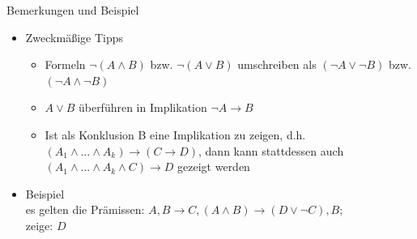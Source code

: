 
\begin{frame}{Bemerkungen und Beispiel}
	\begin{itemize}
		\item Zweckmäßige Tipps
		\begin{itemize}
			\item Formeln $\neg (A \land B)$ bzw. $\neg (A \lor B)$ umschreiben als $(\neg A \lor \neg B)$ bzw. $(\neg A \land \neg B)$
			\item $A \lor B$ überführen in Implikation $\neg A \rightarrow B$
			\item Ist als Konklusion B eine Implikation zu zeigen, d.h.\\
			$(A_1 \land \ldots \land A_k) \rightarrow (C \rightarrow D)$, dann kann stattdessen auch\\
			$(A_1 \land \ldots \land A_k \land C) \rightarrow D$ gezeigt werden
		\end{itemize}
		\item Beispiel\\
			es gelten die Prämissen: $A, B \rightarrow C, (A \land B) \rightarrow (D \lor \neg C), B$;\\
			zeige: $D$
	\end{itemize}
\end{frame}


